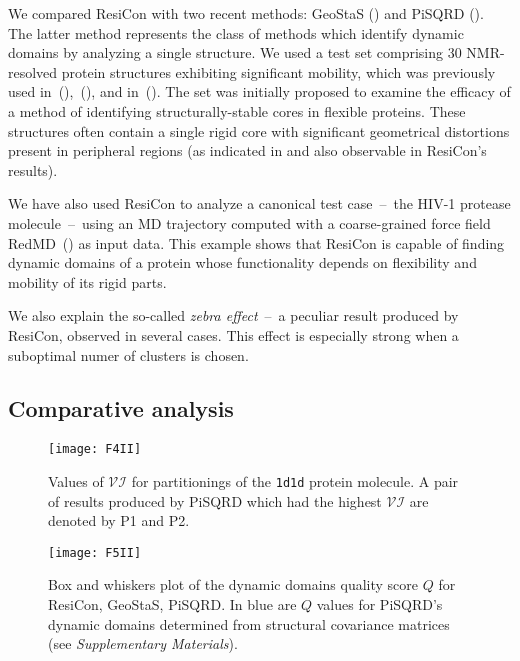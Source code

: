 We compared ResiCon with two recent methods: GeoStaS (\cite{romanowska2012determining}) and PiSQRD (\cite{potestio2009coarse}).
The latter method represents the class of methods which identify dynamic domains by analyzing a single structure.
We used a test set comprising 30 NMR-resolved protein structures exhibiting significant mobility, which was previously used in~(\cite{snyder2005clustering}),~(\cite{kirchner2011objective}), and in~(\cite{romanowska2012determining}).
The set was initially proposed to examine the efficacy of a method of identifying structurally-stable cores in flexible proteins.
These structures often contain a single rigid core with significant geometrical distortions present in peripheral regions (as indicated in \cite{snyder2005clustering} and also observable in ResiCon's results). 

We have also used ResiCon to analyze a canonical test case~--~the HIV-1 protease molecule~--~using an MD trajectory computed with a coarse-grained force field RedMD~(\cite{gorecki36causality,gorecki2009redmd}) as input data.
This example shows that ResiCon is capable of finding dynamic domains of a protein whose functionality depends on flexibility and mobility of its rigid parts.

We also explain the so-called \emph{zebra effect}~--~a peculiar result produced by ResiCon, observed in several cases.
This effect is especially strong when a suboptimal numer of clusters is chosen.

\subsection*{Comparative analysis}



\begin{figure}
\centering
\texttt{[image: F4II]}
\caption{Values of $\mathcal{VI}$ for partitionings of the \texttt{1d1d} protein molecule.
A pair of results produced by PiSQRD which had the highest $\mathcal{VI}$ are denoted by P1 and P2.}
\label{comparison}
\end{figure}

\begin{figure*}
\centering
\texttt{[image: F5II]}
\caption{Box and whiskers plot of the dynamic domains quality score $Q$ for ResiCon, GeoStaS, PiSQRD.
In blue are $Q$ values for PiSQRD's dynamic domains determined from structural covariance matrices (see \emph{Supplementary Materials}).}
\label{boxWhiskers}
\end{figure*}

